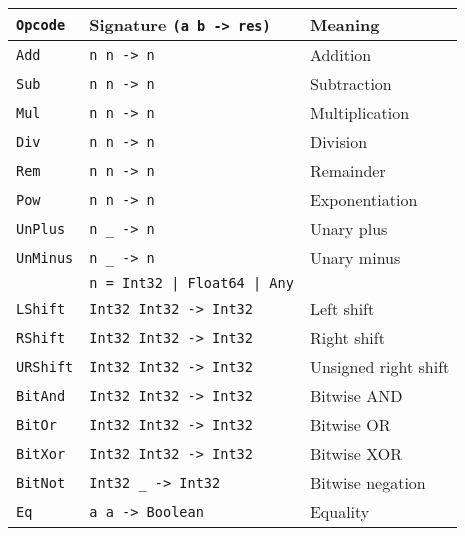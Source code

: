\begin{table}
    \centering
    \begin{tabular}{l | l | l}
        \texttt{Opcode}      & Signature \texttt{(a b -> res)}    &  Meaning                    \\\hline
        \texttt{Add}         & \texttt{n      n     -> n        } &  Addition                   \\
        \texttt{Sub}         & \texttt{n      n     -> n        } &  Subtraction                \\
        \texttt{Mul}         & \texttt{n      n     -> n        } &  Multiplication             \\
        \texttt{Div}         & \texttt{n      n     -> n        } &  Division                   \\
        \texttt{Rem}         & \texttt{n      n     -> n        } &  Remainder                  \\
        \texttt{Pow}         & \texttt{n      n     -> n        } &  Exponentiation             \\
        \texttt{UnPlus}      & \texttt{n      \_    -> n        } &  Unary plus                 \\
        \texttt{UnMinus}     & \texttt{n      \_    -> n        } &  Unary minus                \\
                             & \texttt{n = Int32 | Float64 | Any} &                             \\\hline
        \texttt{LShift}      & \texttt{Int32  Int32 -> Int32    } &  Left shift                 \\
        \texttt{RShift}      & \texttt{Int32  Int32 -> Int32    } &  Right shift                \\
        \texttt{URShift}     & \texttt{Int32  Int32 -> Int32    } &  Unsigned right shift       \\
        \texttt{BitAnd}      & \texttt{Int32  Int32 -> Int32    } &  Bitwise AND                \\
        \texttt{BitOr}       & \texttt{Int32  Int32 -> Int32    } &  Bitwise OR                 \\
        \texttt{BitXor}      & \texttt{Int32  Int32 -> Int32    } &  Bitwise XOR                \\
        \texttt{BitNot}      & \texttt{Int32  \_    -> Int32    } &  Bitwise negation           \\\hline
        \texttt{Eq}          & \texttt{a      a     -> Boolean  } &  Equality                   \\

\end{tabular}
\end{table}
